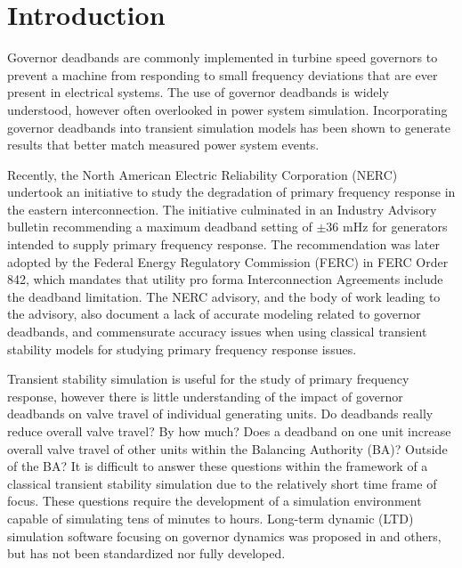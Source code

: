 \section{Introduction}
Governor deadbands are commonly implemented in turbine speed governors to prevent a machine from responding to small frequency deviations that are ever present in electrical systems. The use of governor deadbands is widely understood, however often overlooked in power system simulation.
Incorporating governor deadbands into transient simulation models has been shown to generate results that better match measured power system events\cite{kou2016}.


Recently, the North American Electric Reliability Corporation (NERC) undertook an initiative to study the degradation of primary frequency response in the eastern interconnection\cite{nercFRI2012}. 
The initiative culminated in an Industry Advisory bulletin recommending a maximum deadband setting of $\pm$36 mHz for generators intended to supply primary frequency response. 
The recommendation was later adopted by the Federal Energy Regulatory Commission (FERC) in FERC Order 842, which mandates that utility pro forma Interconnection Agreements include the deadband limitation\cite{FERCxxxx}.
The NERC advisory, and the body of work leading to the advisory, also document a lack of accurate modeling related to governor deadbands, and commensurate accuracy issues when using classical transient stability models for studying primary frequency response issues. 


Transient stability simulation is useful for the study of primary frequency response, however there is little understanding of the impact of governor deadbands on valve travel of individual generating units. 
Do deadbands really reduce overall valve travel? By how much? 
Does a deadband on one unit increase overall valve travel of other units within the Balancing Authority (BA)? Outside of the BA? 
It is difficult to answer these questions within the framework of a classical transient stability simulation due to the relatively short time frame of focus. 
These questions require the development of a simulation environment capable of simulating tens of minutes to hours.
Long-term dynamic (LTD) simulation software focusing on governor dynamics was proposed in \cite{AGCCresap, DonnellyVoltageControl, Stajcar} and others, but has not been standardized nor fully developed.


